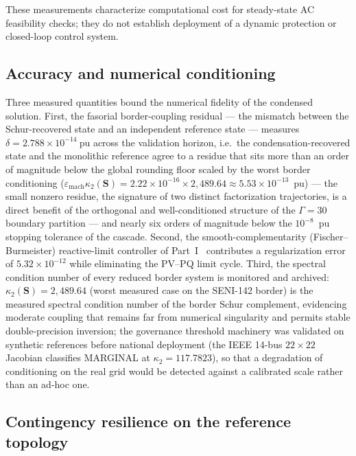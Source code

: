 These measurements characterize computational cost for steady-state AC feasibility checks; they do not establish deployment of a dynamic protection or closed-loop control system.

\subsection{Accuracy and numerical conditioning}
\label{sub:accuracy}

Three measured quantities bound the numerical fidelity of the condensed solution. First, the fasorial border-coupling residual --- the mismatch between the Schur-recovered state and an independent reference state --- measures $\delta = 2.788 \times 10^{-14}\ \mathrm{pu}$ across the validation horizon, i.e.\ the condensation-recovered state and the monolithic reference agree to a residue that sits more than an order of magnitude below the global rounding floor scaled by the worst border conditioning ($\varepsilon_{\mathrm{mach}}\kappa_2(\mathbf{S}) = 2.22 \times 10^{-16} \times 2{,}489.64 \approx 5.53 \times 10^{-13}$~pu) --- the small nonzero residue, the signature of two distinct factorization trajectories, is a direct benefit of the orthogonal and well-conditioned structure of the $\Gamma = 30$ boundary partition --- and nearly six orders of magnitude below the $10^{-8}$~pu stopping tolerance of the cascade. Second, the smooth-complementarity (Fischer--Burmeister) reactive-limit controller of Part~I~\cite{seni142part1} contributes a regularization error of $5.32 \times 10^{-12}$ while eliminating the PV--PQ limit cycle. Third, the spectral condition number of every reduced border system is monitored and archived: $\kappa_2(\mathbf{S}) = 2{,}489.64$ (worst measured case on the SENI-142 border) is the measured spectral condition number of the border Schur complement, evidencing moderate coupling that remains far from numerical singularity and permits stable double-precision inversion; the governance threshold machinery was validated on synthetic references before national deployment (the IEEE 14-bus $22\times22$ Jacobian classifies MARGINAL at $\kappa_2 = 117.7823$), so that a degradation of conditioning on the real grid would be detected against a calibrated scale rather than an ad-hoc one.

\subsection{Contingency resilience on the reference topology}
\label{sub:contingencies}

